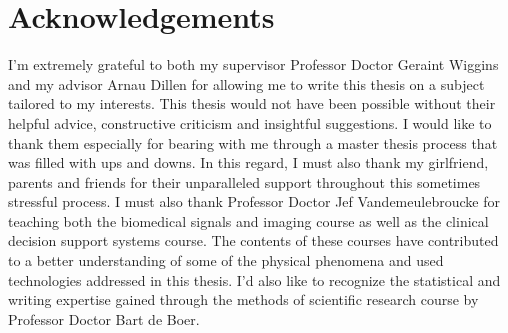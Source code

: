 
\glsresetall

\chapter*{Acknowledgements}
\label{ch:acknowledgements}


I'm extremely grateful to both my supervisor Professor Doctor Geraint Wiggins and my advisor Arnau Dillen for allowing me to write this thesis on a subject tailored to my interests.
This thesis would not have been possible without their helpful advice, constructive criticism and insightful suggestions.
I would like to thank them especially for bearing with me through a master thesis process that was filled with ups and downs.
In this regard, I must also thank my girlfriend, parents and friends for their unparalleled support throughout this sometimes stressful process.
I must also thank Professor Doctor Jef Vandemeulebroucke for teaching both the biomedical signals and imaging course as well as the clinical decision support systems course.
The contents of these courses have contributed to a better understanding of some of the physical phenomena and used technologies addressed in this thesis.
I'd also like to recognize the statistical and writing expertise gained through the methods of scientific research course by Professor Doctor Bart de Boer.

